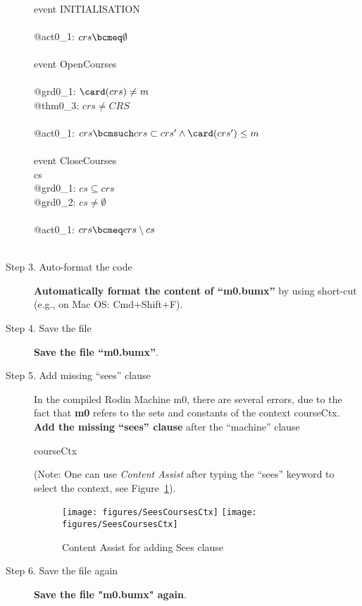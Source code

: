 \begin{description}
\begin{center}
\begin{Bcode}
      \Bevents\\
      \Btab event INITIALISATION\\
      \Btab \Bbegin \\
      \Btab\Btab @act0\_1: \(crs \bcmeq \emptyset\)\\
      \Btab \Bend\\
      \Btab event OpenCourses\\
      \Btab \Bwhere\\
      \Btab \Btab @grd0\_1: \(\card(crs) \neq m\) \\
      \Btab \Btab \Btheorem{} @thm0\_3: \(crs \neq CRS\) \\
      \Btab \Bthen\\
      \Btab \Btab @act0\_1: \(crs \bcmsuch crs \subset crs' \land \card(crs') \leq m\)\\
      \Btab \Bend\\
      \Btab \Banticipated{} event CloseCourses \\
      \Btab \Bany{} cs \Bwhere\\
      \Btab \Btab @grd0\_1: \(cs \subseteq crs\)\\
      \Btab \Btab @grd0\_2: \(cs \neq \emptyset\)\\
      \Btab \Bthen\\
      \Btab \Btab @act0\_1: \(crs \bcmeq crs \setminus cs\)\\
      \Btab \Bend\\
      \Bend
      \endif
    \end{Bcode}
  \end{center}
\item[Step 3. Auto-format the code] \textbf{Automatically format the content of ``m0.bumx''} by using short-cut (e.g., on Mac OS: Cmd+Shift+F).

\item[Step 4. Save the file] \textbf{Save the file ``m0.bumx''}.

\item[Step 5. Add missing ``sees'' clause] In the compiled Rodin Machine m0, there are several errors, due to the fact that \textbf{m0} refers to the sets and constants of the context courseCtx.
  \textbf{Add the missing ``sees'' clause} after the ``machine'' clause
  \begin{center}
    \begin{Bcode}
      \Bsees{} courseCtx
    \end{Bcode}
  \end{center}
  (Note: One can use \emph{Content Assist} after typing the ``sees'' keyword to select the context, see Figure~\ref{fig:SeesCoursesCtx}).
  \begin{figure}[!htbp]
    \centering
    \texttt{[image: figures/SeesCoursesCtx]}
    \else
    \texttt{[image: figures/SeesCoursesCtx]}
    \endif
    \caption{Content Assist for adding Sees clause}
    \label{fig:SeesCoursesCtx}
  \end{figure}

\item[Step 6. Save the file again] \textbf{Save the file "m0.bumx" again}.
\end{description}
